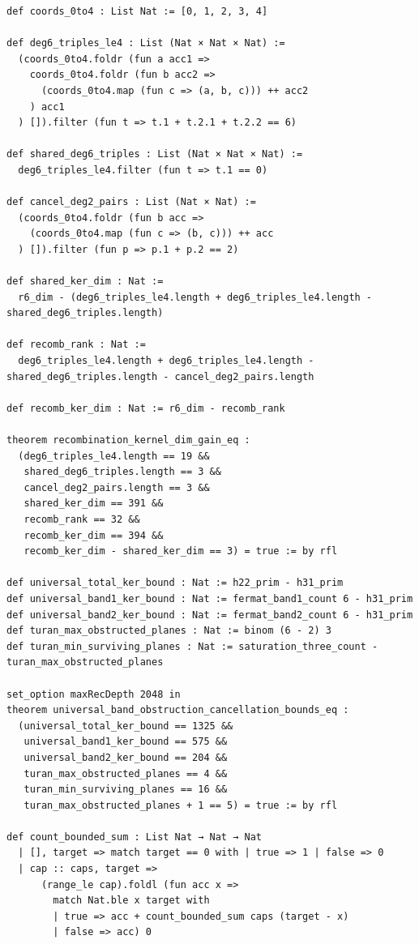 \documentclass[11pt,a4paper]{article}
\begin{document}
\begin{lstlisting}[caption={Recombination kernel gain, universal cancellation bounds, Gorenstein extremes, and $20$-plane collision counts in \texttt{HodgeVerification.lean}.}]
def coords_0to4 : List Nat := [0, 1, 2, 3, 4]

def deg6_triples_le4 : List (Nat × Nat × Nat) :=
  (coords_0to4.foldr (fun a acc1 =>
    coords_0to4.foldr (fun b acc2 =>
      (coords_0to4.map (fun c => (a, b, c))) ++ acc2
    ) acc1
  ) []).filter (fun t => t.1 + t.2.1 + t.2.2 == 6)

def shared_deg6_triples : List (Nat × Nat × Nat) :=
  deg6_triples_le4.filter (fun t => t.1 == 0)

def cancel_deg2_pairs : List (Nat × Nat) :=
  (coords_0to4.foldr (fun b acc =>
    (coords_0to4.map (fun c => (b, c))) ++ acc
  ) []).filter (fun p => p.1 + p.2 == 2)

def shared_ker_dim : Nat :=
  r6_dim - (deg6_triples_le4.length + deg6_triples_le4.length - shared_deg6_triples.length)

def recomb_rank : Nat :=
  deg6_triples_le4.length + deg6_triples_le4.length - shared_deg6_triples.length - cancel_deg2_pairs.length

def recomb_ker_dim : Nat := r6_dim - recomb_rank

theorem recombination_kernel_dim_gain_eq :
  (deg6_triples_le4.length == 19 &&
   shared_deg6_triples.length == 3 &&
   cancel_deg2_pairs.length == 3 &&
   shared_ker_dim == 391 &&
   recomb_rank == 32 &&
   recomb_ker_dim == 394 &&
   recomb_ker_dim - shared_ker_dim == 3) = true := by rfl

def universal_total_ker_bound : Nat := h22_prim - h31_prim
def universal_band1_ker_bound : Nat := fermat_band1_count 6 - h31_prim
def universal_band2_ker_bound : Nat := fermat_band2_count 6 - h31_prim
def turan_max_obstructed_planes : Nat := binom (6 - 2) 3
def turan_min_surviving_planes : Nat := saturation_three_count - turan_max_obstructed_planes

set_option maxRecDepth 2048 in
theorem universal_band_obstruction_cancellation_bounds_eq :
  (universal_total_ker_bound == 1325 &&
   universal_band1_ker_bound == 575 &&
   universal_band2_ker_bound == 204 &&
   turan_max_obstructed_planes == 4 &&
   turan_min_surviving_planes == 16 &&
   turan_max_obstructed_planes + 1 == 5) = true := by rfl

def count_bounded_sum : List Nat → Nat → Nat
  | [], target => match target == 0 with | true => 1 | false => 0
  | cap :: caps, target =>
      (range_le cap).foldl (fun acc x =>
        match Nat.ble x target with
        | true => acc + count_bounded_sum caps (target - x)
        | false => acc) 0


\end{lstlisting}
\end{document}
